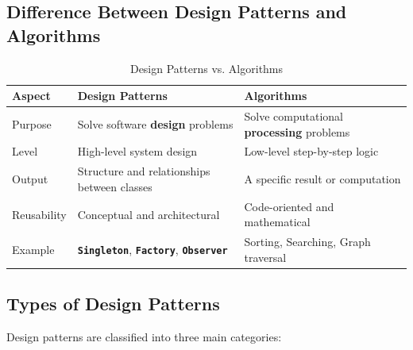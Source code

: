 \documentclass[12pt,a4paper]{article}
\newcommand{\important}[1]{\textbf{\textcolor{accent}{#1}}}
\newcommand{\pattern}[1]{\textbf{\textcolor{secondary}{\texttt{#1}}}}
\begin{document}
\subsection{Difference Between Design Patterns and Algorithms}

\begin{table}[H]
    \centering
    \begin{tabular}{|>{\raggedright\arraybackslash}p{}|>{\raggedright\arraybackslash}p{}|>{\raggedright\arraybackslash}p{}|}
        \hline
        \rowcolor{lightgray}
        \textbf{Aspect} & \textbf{Design Patterns} & \textbf{Algorithms} \\
        \hline
        Purpose & Solve software \important{design} problems & Solve computational \important{processing} problems \\
        \hline
        Level & High-level system design & Low-level step-by-step logic \\
        \hline
        Output & Structure and relationships between classes & A specific result or computation \\
        \hline
        Reusability & Conceptual and architectural & Code-oriented and mathematical \\
        \hline
        Example & \pattern{Singleton}, \pattern{Factory}, \pattern{Observer} & Sorting, Searching, Graph traversal \\
        \hline
    \end{tabular}
    \caption{Design Patterns vs. Algorithms}
    \label{tab:patterns-vs-algorithms}
\end{table}

\subsection{Types of Design Patterns}

Design patterns are classified into three main categories:
\end{document}
